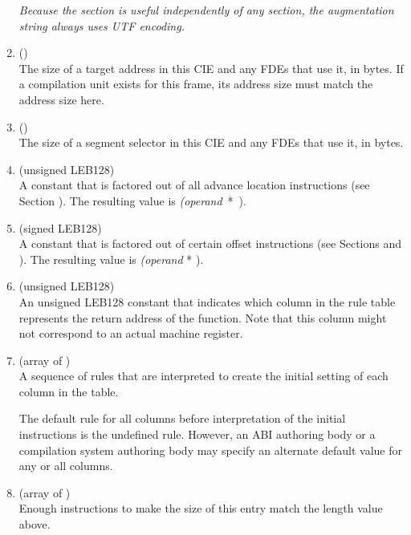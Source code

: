 \begin{enumerate}[1. ]
\textit{Because the \dotdebugframe{} section is useful independently of
any \dotdebuginfo{} section, the augmentation string always uses
UTF encoding.}

\item \HFNaddresssize{} (\HFTubyte) \\
The size of a target address in this CIE and any FDEs that
use it, in bytes. If a compilation unit exists for this frame,
its address size must match the address size here.

\item \HFNsegmentselectorsize{} (\HFTubyte) \\
The size of a segment selector in this CIE and any FDEs that
use it, in bytes.

\item \HFNcodealignmentfactor{} (unsigned LEB128) 
 \\
A 
constant that is factored out of all advance location
instructions (see 
Section ).
The resulting value is  
\mbox{\textit{(operand} * \HFNcodealignmentfactor)}.

\item  \HFNdataalignmentfactor{} (signed LEB128)
 \\
A 
constant that is factored out of certain offset instructions
(see Sections  and 
).
The resulting value is  \textit{(operand} *
\HFNdataalignmentfactor).

\item  \HFNreturnaddressregister{} (unsigned LEB128) \\
An unsigned LEB128 constant that indicates which column in the
rule table represents the return address of the function. Note
that this column might not correspond to an actual machine
register.

\item \HFNinitialinstructions{} (array of \HFTubyte) \\
A sequence of rules that are interpreted to create the initial
setting of each column in the table.  

The default rule for
all columns before interpretation of the initial instructions
is the undefined rule. However, an ABI authoring body or a
compilation system authoring body may specify an alternate
default value for any or all columns.

\item \HFNpadding{} (array of \HFTubyte) \\
Enough \DWCFAnop{} instructions to make the size of this entry
match the length value above.
\end{enumerate}


